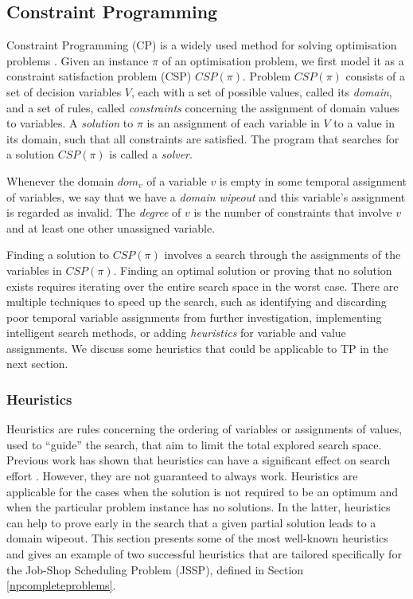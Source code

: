 \documentclass{mprop}
\theoremstyle{definition}
\begin{document}

\subsection{Constraint Programming}
\label{cp}

Constraint Programming (CP) is a widely used method for solving optimisation problems \citep{Caseau97, Manlove07, Mcdonald02}. Given an instance $\pi$ of an optimisation problem, we first model it as a constraint satisfaction problem (CSP) $CSP(\pi)$. Problem $CSP(\pi)$ consists of a set of decision variables $V$, each with a set of possible values, called its \textit{domain}, and a set of rules, called \textit{constraints} concerning the assignment of domain values to variables. A \textit{solution} to $\pi$ is an assignment of each variable in $V$ to a value in its domain, such that all constraints are satisfied. The program that searches for a solution $CSP(\pi)$ is called a \textit{solver}.

Whenever the domain $dom_{v}$ of a variable $v$ is empty in some temporal assignment of variables, we say that we have a \textit{domain wipeout} and this variable's assignment is regarded as invalid. The \textit{degree} of $v$ is the number of constraints that involve $v$ and at least one other unassigned variable.

Finding a solution to $CSP(\pi)$ involves a search through the assignments of the variables in $CSP(\pi)$. Finding an optimal solution or proving that no solution exists requires iterating over the entire search space in the worst case. There are multiple techniques to speed up the search, such as identifying and discarding poor temporal variable assignments from further investigation, implementing intelligent search methods, or adding \textit{heuristics} for variable and value assignments. We discuss some heuristics that could be applicable to TP in the next section.

\subsubsection{Heuristics}
Heuristics are rules concerning the ordering of variables or assignments of values, used to ``guide'' the search, that aim to limit the total explored search space. Previous work has shown that heuristics can have a significant effect on search effort \citep{Haralick80:a, Gent96}. However, they are not guaranteed to always work. Heuristics are applicable for the cases when the solution is not required to be an optimum and when the particular problem instance has no solutions. In the latter, heuristics can help to prove early in the search that a given partial solution leads to a domain wipeout. This section presents some of the most well-known heuristics and gives an example of two successful heuristics that are tailored specifically for the Job-Shop Scheduling Problem (JSSP), defined in Section \ref{npcompleteproblems}.
\end{document}
